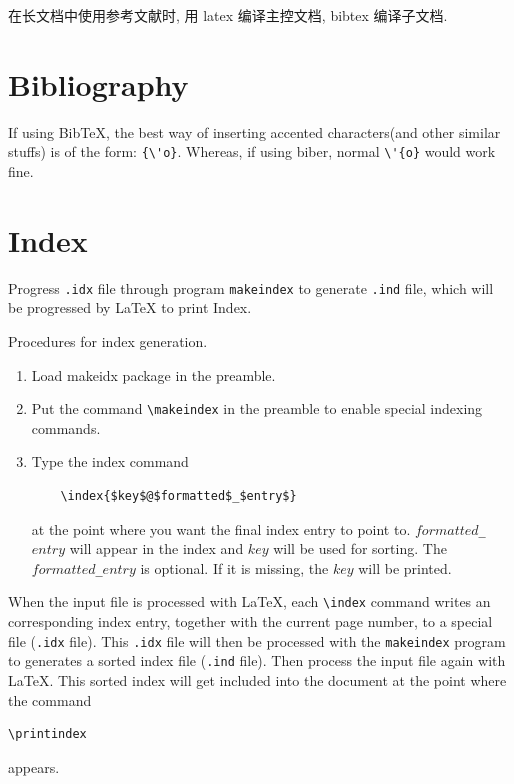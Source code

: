 \documentclass[a4paper,oneside]{book}
\newcommand{\package}[1]{\textsf{#1}}
\begin{document}
在长文档中使用参考文献时, 用 latex 编译主控文档, bibtex 编译子文档.

\chapter{Bibliography}
If using BibTeX, the best way of inserting accented characters(and other similar stuffs) is of the form: \verb|{\'o}|. Whereas, if using biber, normal \verb|\'{o}| would work fine.
\chapter{Index}
Progress \verb|.idx| file through program \verb|makeindex| to generate \verb|.ind| file, which will be progressed by \LaTeX{} to print Index.

Procedures for index generation.
\begin{enumerate}
  \item Load \package{makeidx} package in the preamble.
  \item Put the command \verb|\makeindex| in the preamble to enable special indexing commands.
  \item Type the index command
    \begin{lstlisting}
    \index{$key$@$formatted$_$entry$}
    \end{lstlisting}
    at the point where you want the final index entry to point to. $formatted$\verb|_|$entry$ will appear in the index and $key$ will be used for sorting.
    The $formatted$\verb|_|$entry$ is optional. If it is missing, the $key$ will be printed.
\end{enumerate}

When the input file is processed with \LaTeX{}, each \verb|\index| command writes an corresponding index entry, together with the current page number, to a special file (\verb|.idx| file). This \verb|.idx| file will then be processed with the \verb|makeindex| program to generates a sorted index file (\verb|.ind| file). Then process the input file again with \LaTeX{}. This sorted index will get included into the document at the point where the command
\begin{lstlisting}
\printindex
\end{lstlisting}
appears.
\end{document}
